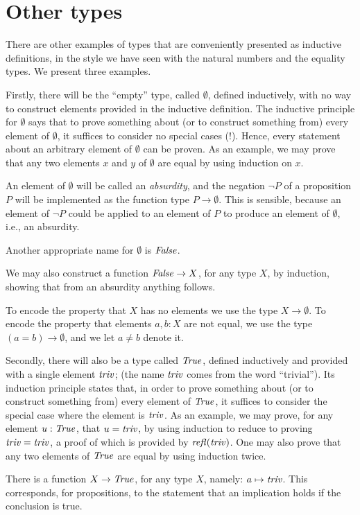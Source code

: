 \documentclass[letter,12pt]{amsart}
\theoremstyle{definition}
\theoremstyle{remark}
\numberwithin{equation}{section}
\newcommand{\refl}{\mathop{{\it refl}}}
\newcommand{\true}{\mathop{{\it True}}}
\newcommand{\false}{\mathop{{\it False}}}
\newcommand{\triv}{\mathop{{\it triv}}}
\begin{document}
\section{Other types}

There are other examples of types that are conveniently presented as inductive definitions, in the style we have seen with the natural numbers
and the equality types.  We present three examples.

Firstly, there will be the ``empty'' type, called $\emptyset$, defined inductively, with no way to construct elements provided in the
inductive definition.  The inductive principle for $\emptyset$ says that to prove something about (or to construct something from) every element
of $\emptyset$, it suffices to consider no special cases (!).  Hence, every statement about an arbitrary element of $\emptyset$ can be proven.
As an example, we may prove that any two elements $x$ and $y$ of $\emptyset$ are equal by using induction on $x$.

An element of $\emptyset$ will be called an {\em absurdity}, and the negation $\neg P$ of a proposition $P$ will be implemented as the function
type $P \to \emptyset$.  This is sensible, because an element of $\neg P$ could be applied to an element of $P$ to produce an element of
$\emptyset$, i.e., an absurdity.

Another appropriate name for $\emptyset$ is $\false$.

We may also construct a function $\false \to X$, for any type $X$, by induction, showing that from an absurdity anything follows.

To encode the property that $X$ has no elements we use the type $X \to \emptyset$.  To encode the property that elements $a,b:X$ are not equal,
we use the type $(a=b) \to \emptyset$, and we let $a \ne b$ denote it.

Secondly, there will also be a type called $\true$, defined inductively and provided with a single element $\triv$; (the name $\triv$ comes from the word
  ``trivial'').  Its induction principle
states that, in order to prove something about (or to construct something from) every element of $\true$, it suffices to consider the special
case where the element is $\triv$.  As an example, we may prove, for any element $u : \true$, that $u=\triv$, by using induction to reduce
to proving $\triv=\triv$, a proof of which is provided by $\refl(\triv)$.  One may also prove that any two elements of $\true$ are equal by using induction twice.

There is a function $X \to \true$, for any type $X$, namely: $a \mapsto \triv$.  This corresponds, for propositions, to the statement that an
implication holds if the conclusion is true.
\end{document}

